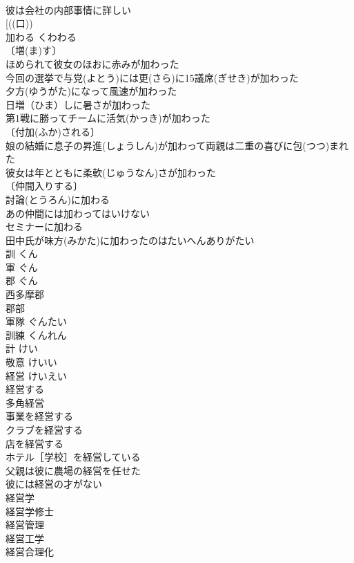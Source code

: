 \documentclass[8pt]{extreport}
\begin{document}
\begin{CJK}{UTF8}{min}
\\	彼は会社の内部事情に詳しい 
\\	[((口))
\\	加わる	くわわる	
\\	〔増(ま)す〕
\\	ほめられて彼女のほおに赤みが加わった 
\\	今回の選挙で与党(よとう)には更(さら)に15議席(ぎせき)が加わった 
\\	夕方(ゆうがた)になって風速が加わった 
\\	日増（ひま）しに暑さが加わった 
\\	第1戦に勝ってチームに活気(かっき)が加わった 
\\	〔付加(ふか)される〕
\\	娘の結婚に息子の昇進(しょうしん)が加わって両親は二重の喜びに包(つつ)まれた 
\\	彼女は年とともに柔軟(じゅうなん)さが加わった 
\\	〔仲間入りする〕
\\	討論(とうろん)に加わる 
\\	あの仲間には加わってはいけない 
\\	セミナーに加わる 
\\	田中氏が味方(みかた)に加わったのはたいへんありがたい 
\\	訓	くん	
\\	軍	ぐん	
\\	郡	ぐん	
\\	西多摩郡 
\\	郡部 
\\	軍隊	ぐんたい	
\\	訓練	くんれん	
\\	計	けい	
\\	敬意	けいい	
\\	経営	けいえい	
\\	経営する 
\\	多角経営 
\\	事業を経営する 
\\	クラブを経営する 
\\	店を経営する 
\\	ホテル［学校］を経営している 
\\	父親は彼に農場の経営を任せた 
\\	彼には経営の才がない 
\\	経営学 
\\	経営学修士 
\\	経営管理 
\\	経営工学 
\\	経営合理化 

\end{CJK}
\end{document}
